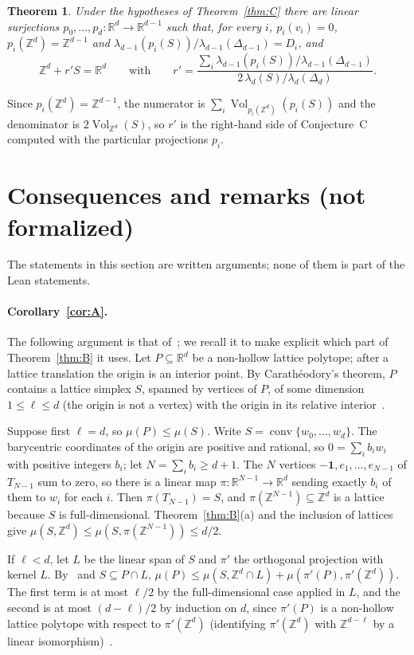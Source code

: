 \documentclass[11pt]{article}
\newtheorem{thmprime}{Theorem}
\theoremstyle{definition}
\theoremstyle{remark}
\newcommand{\R}{\mathbb R}
\newcommand{\Z}{\mathbb Z}
\newcommand{\one}{\mathbf 1}
\newcommand{\conv}{\operatorname{conv}}
\newcommand{\Vol}{\operatorname{Vol}}
\begin{document}
\begin{thmprime}\label{thm:Cm}
Under the hypotheses of Theorem~\ref{thm:C} there are linear surjections
$p_0,\dots,p_d\colon\R^d\to\R^{d-1}$ such that, for every $i$, $p_i(v_i)=0$,
$p_i(\Z^d)=\Z^{d-1}$ and $\lambda_{d-1}(p_i(S))/\lambda_{d-1}(\Delta_{d-1})=D_i$,
and
\[
\Z^d+r'S=\R^d\qquad\text{with}\qquad
r'=\frac{\sum_i\lambda_{d-1}(p_i(S))/\lambda_{d-1}(\Delta_{d-1})}{2\,\lambda_d(S)/\lambda_d(\Delta_d)} .
\]
\end{thmprime}

\noindent Since $p_i(\Z^d)=\Z^{d-1}$, the numerator is
$\sum_i\Vol_{p_i(\Z^d)}(p_i(S))$ and the denominator is $2\Vol_{\Z^d}(S)$, so
$r'$ is the right-hand side of Conjecture~C computed with the particular
projections $p_i$.

\section{Consequences and remarks (not formalized)}\label{sec:cons}

The statements in this section are written arguments; none of them is part of
the Lean statements.

\paragraph{Corollary~\ref{cor:A}.} The following argument is that
of~\cite[Section~3.1]{css}; we recall it to make explicit which part of
Theorem~\ref{thm:B} it uses. Let $P\subseteq\R^d$ be a non-hollow lattice
polytope; after a lattice translation the origin is an interior point. By
Carathéodory's theorem, $P$ contains a lattice simplex $S$, spanned by vertices of $P$, of some
dimension $1\le\ell\le d$ (the origin is not a vertex) with the origin in its
relative interior~\cite[Lemma~3.1]{css}.

Suppose first $\ell=d$, so $\mu(P)\le\mu(S)$. Write $S=\conv\{w_0,\dots,w_d\}$.
The barycentric coordinates of the origin are positive and rational, so
$0=\sum_ib_iw_i$ with positive integers $b_i$; let $N=\sum_ib_i\ge d+1$. The
$N$ vertices $-\one,e_1,\dots,e_{N-1}$ of $T_{N-1}$ sum to zero, so there is a
linear map $\pi\colon\R^{N-1}\to\R^d$ sending exactly $b_i$ of them to $w_i$
for each $i$. Then $\pi(T_{N-1})=S$, and $\pi(\Z^{N-1})\subseteq\Z^d$ is a
lattice because $S$ is full-dimensional. Theorem~\ref{thm:B}(a) and the
inclusion of lattices give
$\mu(S,\Z^d)\le\mu(S,\pi(\Z^{N-1}))\le d/2$.

If $\ell<d$, let $L$ be the linear span of $S$ and $\pi'$ the orthogonal
projection with kernel $L$. By~\cite[Lemma~2.1]{css} and $S\subseteq P\cap L$,
$\mu(P)\le\mu(S,\Z^d\cap L)+\mu(\pi'(P),\pi'(\Z^d))$. The first term is at
most $\ell/2$ by the full-dimensional case applied in $L$, and the second is
at most $(d-\ell)/2$ by induction on $d$, since $\pi'(P)$ is a non-hollow
lattice polytope with respect to $\pi'(\Z^d)$ (identifying $\pi'(\Z^d)$ with
$\Z^{d-\ell}$ by a linear isomorphism)~\cite[Corollary~3.2]{css}.
\end{document}

